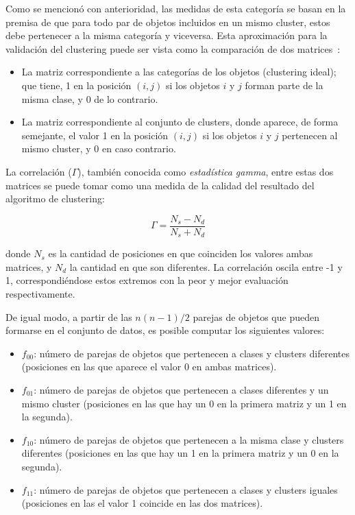 Como se mencionó con anterioridad, las medidas de esta categoría se basan en la premisa de que para todo par de objetos incluidos en un mismo cluster, estos debe pertenecer a la misma categoría y viceversa.
Esta aproximación para la validación del clustering puede ser vista como la comparación de dos matrices~\cite{Tan05}:

\begin{itemize}
    \item La matriz correspondiente a las categorías de los objetos (clustering ideal);
    que tiene, 1 en la posición $(i, j)$ si los objetos $i$ y $j$ forman parte de la misma clase, y 0 de lo contrario.
    \item La matriz correspondiente al conjunto de clusters, donde aparece, de forma semejante, el valor 1 en la posición $(i,j)$ si los objetos $i$ y $j$ pertenecen al mismo cluster, y 0 en caso contrario.
\end{itemize}

La correlación ($\Gamma$), también conocida como \textit{estadística gamma}, entre estas dos matrices se puede tomar como una medida de la calidad del resultado del algoritmo de clustering:

\begin{equation}
    \label{eq:gamma-statistic}
    \Gamma = \frac{N_s - N_d}{N_s + N_d}
\end{equation}

\noindent
donde $N_s$ es la cantidad de posiciones en que coinciden los valores ambas matrices, y $N_d$ la cantidad en que son diferentes.
La correlación oscila entre -1 y 1, correspondiéndose estos extremos con la peor y mejor evaluación respectivamente.

De igual modo, a partir de las $n(n-1)/2$ parejas de objetos que pueden formarse en el conjunto de datos, es posible computar los siguientes valores:

\begin{itemize}
    \item $f_{00}$: número de parejas de objetos que pertenecen a clases y clusters diferentes (posiciones en las que aparece el valor 0 en ambas matrices).
    \item $f_{01}$: número de parejas de objetos que pertenecen a clases diferentes y un mismo cluster (posiciones en las que hay un 0 en la primera matriz y un 1 en la segunda).
    \item $f_{10}$: número de parejas de objetos que pertenecen a la misma clase y clusters diferentes (posiciones en las que hay un 1 en la primera matriz y un 0 en la segunda).
    \item $f_{11}$: número de parejas de objetos que pertenecen a clases y clusters iguales (posiciones en las el valor 1 coincide en las dos matrices).
\end{itemize}

